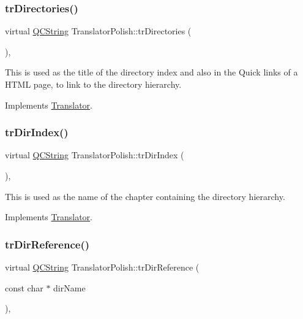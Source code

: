 \subsubsection{\texorpdfstring{trDirectories()}{trDirectories()}}
{\footnotesize\ttfamily virtual \mbox{\hyperlink{class_q_c_string}{Q\+C\+String}} Translator\+Polish\+::tr\+Directories (\begin{DoxyParamCaption}{ }\end{DoxyParamCaption})\hspace{0.3cm}{\ttfamily [inline]}, {\ttfamily [virtual]}}

This is used as the title of the directory index and also in the Quick links of a H\+T\+ML page, to link to the directory hierarchy. 

Implements \mbox{\hyperlink{class_translator}{Translator}}.

\mbox{\label{class_translator_polish_a347895b3f2a13544f01310ca7bc03a00}} 
\subsubsection{\texorpdfstring{trDirIndex()}{trDirIndex()}}
{\footnotesize\ttfamily virtual \mbox{\hyperlink{class_q_c_string}{Q\+C\+String}} Translator\+Polish\+::tr\+Dir\+Index (\begin{DoxyParamCaption}{ }\end{DoxyParamCaption})\hspace{0.3cm}{\ttfamily [inline]}, {\ttfamily [virtual]}}

This is used as the name of the chapter containing the directory hierarchy. 

Implements \mbox{\hyperlink{class_translator}{Translator}}.

\mbox{\label{class_translator_polish_a81612a5c664efbf969a754858f681160}} 
\subsubsection{\texorpdfstring{trDirReference()}{trDirReference()}}
{\footnotesize\ttfamily virtual \mbox{\hyperlink{class_q_c_string}{Q\+C\+String}} Translator\+Polish\+::tr\+Dir\+Reference (\begin{DoxyParamCaption}\item[{const char $\ast$}]{dir\+Name }\end{DoxyParamCaption})\hspace{0.3cm}{\ttfamily [inline]}, {\ttfamily [virtual]}}

